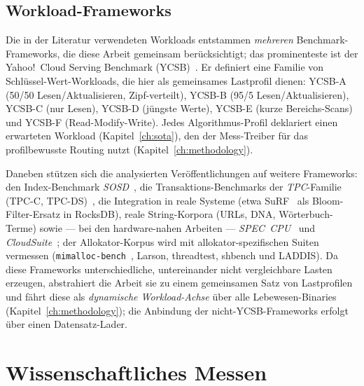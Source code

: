 \subsection{Workload-Frameworks}\label{sec:ycsb}
Die in der Literatur verwendeten Workloads entstammen \emph{mehreren} Benchmark-Frameworks, die
diese Arbeit gemeinsam berücksichtigt; das prominenteste ist der Yahoo!\ Cloud Serving Benchmark
(YCSB)~\cite{cooper2010ycsb}. Er definiert eine Familie von Schlüssel-Wert-Workloads, die hier als
gemeinsames Lastprofil dienen: YCSB-A (50/50 Lesen/Aktualisieren, Zipf-verteilt), YCSB-B (95/5
Lesen/Aktualisieren), YCSB-C (nur Lesen), YCSB-D (jüngste Werte), YCSB-E (kurze Bereichs-Scans) und
YCSB-F (Read-Modify-Write). Jedes Algorithmus-Profil deklariert einen erwarteten Workload
(Kapitel~\ref{ch:sota}), den der Mess-Treiber für das profilbewusste Routing nutzt
(Kapitel~\ref{ch:methodology}).

Daneben stützen sich die analysierten Veröffentlichungen auf weitere Frameworks: den Index-Benchmark
\emph{SOSD}~\cite{kipf2019sosd}, die Transaktions-Benchmarks der \emph{TPC}-Familie (TPC-C,
TPC-DS)~\cite{tpc_benchmarks}, die Integration in reale Systeme (etwa SuRF~\cite{zhang2018surf} als
Bloom-Filter-Ersatz in RocksDB), reale String-Korpora (URLs, DNA, Wörterbuch-Terme) sowie --- bei
den hardware-nahen Arbeiten --- \emph{SPEC~CPU}~\cite{spec_cpu2017} und
\emph{CloudSuite}~\cite{ferdman2012cloudsuite}; der Allokator-Korpus wird mit allokator-spezifischen
Suiten vermessen (\texttt{mimalloc-bench}~\cite{mimalloc_bench}, Larson, threadtest, shbench und
LADDIS). Da diese Frameworks unterschiedliche, untereinander nicht vergleichbare Lasten erzeugen,
abstrahiert die Arbeit sie zu einem gemeinsamen Satz von Lastprofilen und fährt diese als
\emph{dynamische Workload-Achse} über alle Lebewesen-Binaries (Kapitel~\ref{ch:methodology}); die
Anbindung der nicht-YCSB-Frameworks erfolgt über einen Datensatz-Lader.

\section{Wissenschaftliches Messen}\label{sec:measurement-basics}

